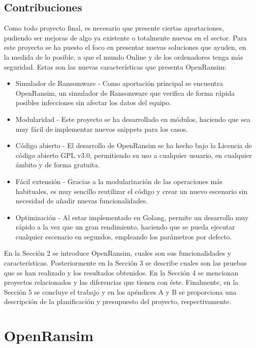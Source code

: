 \documentclass[a4paper,12pt]{article}
\begin{document}
\subsection{Contribuciones}
Como todo proyecto final, es necesario que presente ciertas aportaciones, pudiendo ser mejoras de algo ya existente o totalmente nuevas en el sector. Para este proyecto se ha puesto el foco en presentar nuevas soluciones que ayuden, en la medida de lo posible, a que el mundo Online y de los ordenadores tenga más seguridad. Estas son las nuevas características que presenta OpenRansim: 
\begin{itemize}
	\item Simulador de Ransomware - Como aportación principal se encuentra OpenRansim, un simulador de Ransomware que verifica de forma rápida posibles infecciones sin afectar los datos del equipo.
	\item Modularidad - Este proyecto se ha desarrollado en módulos, haciendo que sea muy fácil de implementar nuevos snippets para los casos.
	\item Código abierto - El desarrollo de OpenRansim se ha hecho bajo la Licencia de código abierto GPL v3.0, permitiendo su uso a cualquier usuario, en cualquier ámbito y de forma gratuita.
	\item Fácil extensión - Gracias a la modularización de las operaciones más habituales, es muy sencillo reutilizar el código y crear un nuevo escenario sin necesidad de añadir nuevas funcionalidades.
	\item Optimización - Al estar implementado en Golang\cite{golang}, permite un desarrollo muy rápido a la vez que un gran rendimiento, haciendo que se pueda ejecutar cualquier escenario en segundos, empleando los parámetros por defecto.
\end{itemize}
En la Sección 2 se introduce OpenRansim, cuales son sus funcionalidades y características. Posteriormente en la Sección 3 se describe cuales son las pruebas que se han realizado y los resultados obtenidos. En la Sección 4 se mencionan proyectos relacionados y las diferencias que tienen con éste. Finalmente, en la Sección 5 se concluye el trabajo y en los apéndices A y B se proporciona una descripción de la planificación y presupuesto del proyecto, respectivamente.
\newpage
\section{OpenRansim}
\end{document}
